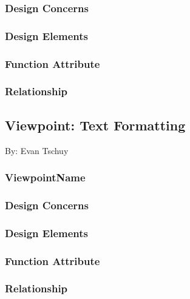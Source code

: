 \documentclass[letterpaper, 10pt, draftclsnofoot, compsoc, onecolumn]{IEEEtran}
\begin{document}
\subsubsection{Design Concerns}
{\noindent  \par}

\subsubsection{Design Elements}
{\noindent  \par}

\subsubsection{Function Attribute}
{\noindent  \par}

\subsubsection{Relationship}


\subsection{Viewpoint: Text Formatting}
{\noindent By: Evan Tschuy \par}

\subsubsection{ViewpointName}
{\noindent  \par}

\subsubsection{Design Concerns}
{\noindent  \par}

\subsubsection{Design Elements}
{\noindent  \par}

\subsubsection{Function Attribute}
{\noindent  \par}

\subsubsection{Relationship}
\end{document}
